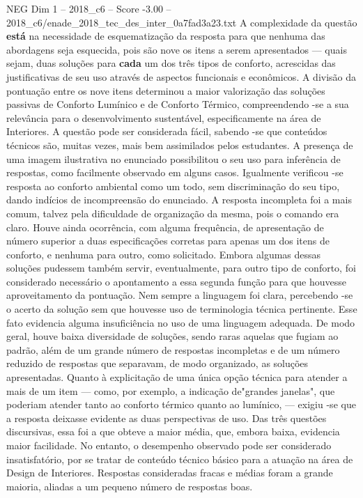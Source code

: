 \begin{textsample}{NEG Dim 1 – 2018\_c6 – Score -3.00 – 2018\_c6/enade\_2018\_tec\_des\_inter\_0a7fad3a23.txt}
A complexidade da questão \textbf{está} na necessidade de esquematização da resposta para que nenhuma das abordagens seja esquecida, pois são nove os itens a serem apresentados — quais sejam, duas soluções para \textbf{cada} um dos três tipos de conforto, acrescidas das justificativas de seu uso através de aspectos funcionais e econômicos.
A divisão da pontuação entre os nove itens determinou a maior valorização das soluções passivas de Conforto Lumínico e de Conforto Térmico, compreendendo -se a sua relevância para o desenvolvimento sustentável, especificamente na área de Interiores.
A questão pode ser considerada fácil, sabendo -se que conteúdos técnicos são, muitas vezes, mais bem assimilados pelos estudantes.
A presença de uma imagem ilustrativa no enunciado possibilitou o seu uso para inferência de respostas, como facilmente observado em alguns casos.
Igualmente verificou -se resposta ao conforto ambiental como um todo, sem discriminação do seu tipo, dando indícios de incompreensão do enunciado.
A resposta incompleta foi a mais comum, talvez pela dificuldade de organização da mesma, pois o comando era claro.
Houve ainda ocorrência, com alguma frequência, de apresentação de número superior a duas especificações corretas para apenas um dos itens de conforto, e nenhuma para outro, como solicitado.
Embora algumas dessas soluções pudessem também servir, eventualmente, para outro tipo de conforto, foi considerado necessário o apontamento a essa segunda função para que houvesse aproveitamento da pontuação.
Nem sempre a linguagem foi clara, percebendo -se o acerto da solução sem que houvesse uso de terminologia técnica pertinente.
Esse fato evidencia alguma insuficiência no uso de uma linguagem adequada.
De modo geral, houve baixa diversidade de soluções, sendo raras aquelas que fugiam ao padrão, além de um grande número de respostas incompletas e de um número reduzido de respostas que separavam, de modo organizado, as soluções apresentadas.
Quanto à explicitação de uma única opção técnica para atender a mais de um item — como, por exemplo, a indicação de"grandes janelas", que poderiam atender tanto ao conforto térmico quanto ao lumínico, — exigiu -se que a resposta deixasse evidente as duas perspectivas de uso.
Das três questões discursivas, essa foi a que obteve a maior média, que, embora baixa, evidencia maior facilidade.
No entanto, o desempenho observado pode ser considerado insatisfatório, por se tratar de conteúdo técnico básico para a atuação na área de Design de Interiores.
Respostas consideradas fracas e médias foram a grande maioria, aliadas a um pequeno número de respostas boas.

\end{textsample}
